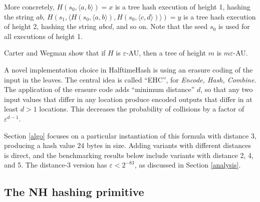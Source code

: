 \documentclass[runningheads]{llncs}
\begin{document}
More concretely, $H(s_0,\langle{}a,b\rangle) = x$ is a tree hash execution of height 1, hashing the string $ab$, $H(s_1, \langle H(s_0, \langle a,b\rangle), H(s_0, \langle c,d\rangle)\rangle) = y$ is a tree hash execution of height 2, hashing the string $abcd$, and so on.
Note that the seed $s_0$ is used for all executions of height 1.

Carter and Wegman show that if $H$ is $\varepsilon$-AU, then a tree of height $m$ is $m\varepsilon$-AU.

A novel implementation choice in HalftimeHash is using an erasure coding of the input in the leaves.
The central idea is called ``EHC'', for {\em Encode, Hash, Combine}. \cite{ehc-nandi}
The application of the erasure code adds ``minimum distance'' $d$, so that any two input values that differ in any location produce encoded outputs that differ in at least $d > 1$ locations.
This decreases the probability of collisions by a factor of $\varepsilon^{d-1}$.


Section \ref{algo} focuses on a particular instantiation of this formula with distance $3$, producing a hash value $24$ bytes in size.
Adding variants with different distances is direct, and the benchmarking results below include variants with distance 2, 4, and 5.
The distance-3 version has $\varepsilon < 2^{-83}$, as discussed in Section \ref{analysis}.

\subsection{The NH hashing primitive}
\end{document}

